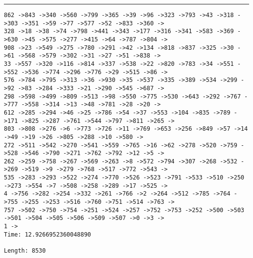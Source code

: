 \documentclass[letter, 12pt]{article}
\newenvironment{question}[1]{%
    \vspace{.2in}%
        \noindent{\bf #1}%
    \vspace{0.3em} \hrule \vspace{.1in}%
}{}
\begin{document}
\begin{question}{\large Appendix}
\begin{lstlisting}[style=CStyle]
862 ->843 ->340 ->560 ->799 ->365 ->39 ->96 ->323 ->793 ->43 ->318 ->303 ->351 ->59 ->77 ->577 ->52 ->833 ->360 ->
328 ->18 ->38 ->74 ->798 ->441 ->343 ->177 ->316 ->341 ->583 ->369 ->630 ->45 ->575 ->277 ->415 ->64 ->787 ->804 ->
908 ->23 ->549 ->275 ->780 ->291 ->42 ->134 ->818 ->837 ->325 ->30 ->61 ->568 ->579 ->302 ->31 ->27 ->51 ->838 ->
33 ->557 ->320 ->116 ->814 ->337 ->538 ->22 ->820 ->783 ->34 ->551 ->552 ->536 ->774 ->296 ->776 ->29 ->515 ->86 ->
576 ->784 ->795 ->313 ->36 ->930 ->35 ->537 ->335 ->389 ->534 ->299 ->92 ->83 ->284 ->333 ->21 ->290 ->545 ->687 ->
298 ->598 ->499 ->809 ->513 ->98 ->550 ->775 ->530 ->643 ->292 ->767 ->777 ->558 ->314 ->13 ->48 ->781 ->28 ->20 ->
612 ->285 ->294 ->46 ->25 ->786 ->54 ->37 ->553 ->104 ->835 ->789 ->171 ->825 ->287 ->761 ->544 ->797 ->811 ->265 ->
803 ->808 ->276 ->6 ->773 ->726 ->11 ->769 ->653 ->256 ->849 ->57 ->14 ->49 ->19 ->26 ->805 ->288 ->10 ->580 ->
272 ->511 ->542 ->270 ->541 ->559 ->765 ->16 ->62 ->278 ->520 ->759 ->528 ->546 ->790 ->271 ->762 ->792 ->12 ->5 ->
262 ->259 ->758 ->267 ->569 ->263 ->8 ->572 ->794 ->307 ->268 ->532 ->269 ->519 ->9 ->279 ->768 ->517 ->772 ->543 ->
535 ->283 ->293 ->522 ->274 ->770 ->526 ->523 ->791 ->533 ->510 ->250 ->273 ->554 ->7 ->508 ->258 ->289 ->17 ->525 ->
4 ->756 ->282 ->254 ->332 ->261 ->766 ->2 ->264 ->512 ->785 ->764 ->755 ->255 ->253 ->516 ->760 ->751 ->514 ->763 ->
757 ->502 ->750 ->754 ->251 ->524 ->257 ->752 ->753 ->252 ->500 ->503 ->501 ->504 ->505 ->506 ->509 ->507 ->0 ->3 ->
1 ->
Time: 12.9266952360048890

Length: 8530


\end{lstlisting}
\end{question}
\end{document}
